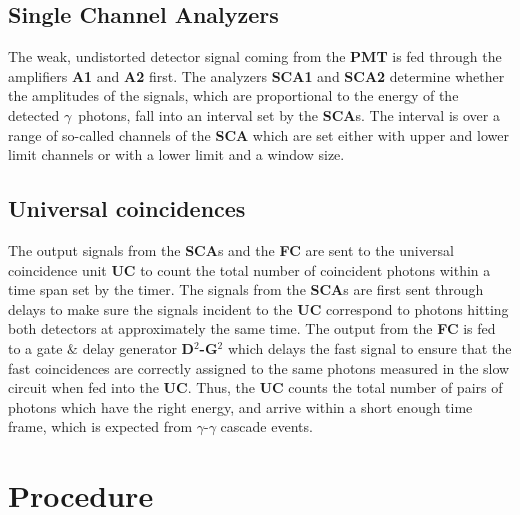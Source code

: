 \documentclass[twocolumn]{article}
\begin{document}

\subsection{Single Channel Analyzers}
The weak, undistorted detector signal coming from the \textbf{PMT} is fed through the amplifiers \textbf{A1} and \textbf{A2} first. The analyzers \textbf{SCA1} and \textbf{SCA2} determine whether the amplitudes of the signals, which are proportional to the energy of the detected $\gamma$~photons, fall into an interval set by the \textbf{SCA}s. The interval is over a range of so-called channels of the \textbf{SCA} which are set either with upper and lower limit channels or with a lower limit and a window size.

\subsection{Universal coincidences}
The output signals from the \textbf{SCA}s and the \textbf{FC} are sent to the universal coincidence unit \textbf{UC} to count the total number of coincident photons within a time span set by the timer. The signals from the \textbf{SCA}s are first sent through delays to make sure the signals incident to the \textbf{UC} correspond to photons hitting both detectors at approximately the same time. The output from the \textbf{FC} is fed to a gate $\&$ delay generator \textbf{D$^2$-G$^2$} which delays the fast signal to ensure that the fast coincidences are correctly assigned to the same photons measured in the slow circuit when fed into the \textbf{UC}. Thus, the \textbf{UC} counts the total number of pairs of photons which have the right energy, and arrive within a short enough time frame, which is expected from $\gamma$-$\gamma$ cascade events.


\section{Procedure} \label{sec:Proc}
\end{document}
